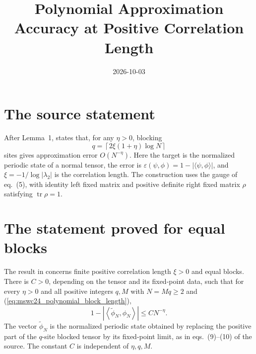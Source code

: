 \documentclass{article}
\title{Polynomial Approximation Accuracy at Positive Correlation Length}
\author{}
\date{2026-10-03}
\begin{document}
\maketitle
{}

\section{The source statement}
After Lemma~1, \cite[p.~4]{Malz2024Preparation} states that, for any
$\eta>0$, blocking
\begin{equation}
    q=\left\lceil 2\xi(1+\eta)\log N\right\rceil
    \label{eq:mswc24_polynomial_block_length}
\end{equation}
sites gives approximation error $O(N^{-\eta})$. Here the target is the
normalized periodic state of a normal tensor, the error is
$\varepsilon(\psi,\phi)=1-|\langle\psi,\phi\rangle|$, and
$\xi=-1/\log|\lambda_2|$ is the correlation length. The construction uses
the gauge of eq.~(5), with identity left fixed matrix and positive definite
right fixed matrix $\rho$ satisfying $\operatorname{tr}\rho=1$.

\section{The statement proved for equal blocks}
The result in  concerns
finite positive correlation length $\xi>0$ and equal blocks. There is
$C>0$, depending on the tensor and its fixed-point data, such that for
every $\eta>0$ and all positive integers $q,M$ with
$N=Mq\geq2$ and (\ref{eq:mswc24_polynomial_block_length}),
\begin{equation}
    1-\left|\left\langle\widetilde\phi_N,\phi_N\right\rangle\right|
    \leq C N^{-\eta}.
    \label{eq:mswc24_polynomial_uniform_error}
\end{equation}
The vector $\widetilde\phi_N$ is the normalized periodic state obtained
by replacing the positive part of the $q$-site blocked tensor by its
fixed-point limit, as in eqs.~(9)--(10) of the source. The constant $C$ is
independent of $\eta,q,M$.
\end{document}
